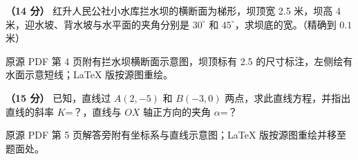\begin{question}
\textbf{（14 分）} 红升人民公社小水库拦水坝的横断面为梯形，坝顶宽 2.5 米，坝高 4 米，迎水坡、背水坡与水平面的夹角分别是 $30^\circ$ 和 $45^\circ$，求坝底的宽。（精确到 $0.1$ 米）

\begin{gktip}
原源 PDF 第 4 页附有拦水坝横断面示意图，坝顶标有 2.5 的尺寸标注，左侧绘有水面示意短线；LaTeX 版按源图重绘。
\end{gktip}
\nopagebreak[4]
\begin{center}\end{center}
\nopagebreak[4]
\Needspace{0.4\textheight}
\end{question}
\begin{question}
\textbf{（15 分）} 已知，直线过 $A(2,-5)$ 和 $B(-3,0)$ 两点，求此直线方程，并指出直线的斜率 $K$=？，直线与 $OX$ 轴正方向的夹角 $\alpha$=？

\begin{gktip}
原源 PDF 第 5 页解答旁附有坐标系与直线示意图；LaTeX 版按源图重绘并移至题面处。
\end{gktip}
\nopagebreak[4]
\begin{center}\end{center}
\nopagebreak[4]

\end{question}